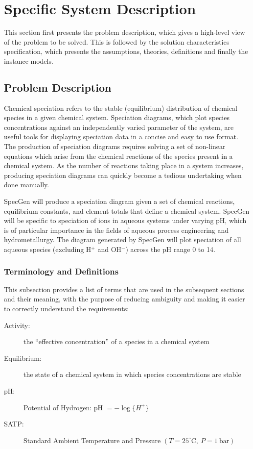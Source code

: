 \documentclass[12pt]{article}
\newcommand{\progname}{SpecGen} %
\begin{document}
\section{Specific System Description}

This section first presents the problem description, which gives a high-level
view of the problem to be solved.  This is followed by the solution 
characteristics specification, which presents the assumptions, theories, 
definitions and finally the instance models.

\subsection{Problem Description} \label{Sec_pd}
Chemical speciation refers to the stable (equilibrium) distribution of chemical 
species in a given chemical system. Speciation diagrams, which plot species 
concentrations against an independently varied parameter of the system, are 
useful tools for displaying speciation data in a concise and easy to use format. 
The production of speciation diagrams requires solving a set of non-linear 
equations which arise from the chemical reactions of the species present in a 
chemical system.  As the number of reactions taking place in a system increases, 
producing speciation diagrams can quickly become a tedious undertaking when done 
manually.

\progname{} will produce a speciation diagram given a set of chemical reactions, 
equilibrium constants, and element totals that define a chemical system. 
\progname{} will be specific to speciation of ions in aqueous systems under 
varying pH, which is of particular importance in the fields of aqueous process 
engineering and hydrometallurgy.  The diagram generated by \progname{} will 
plot speciation of all aqueous species (excluding H$^+$ and OH$^-$) across the 
pH range 0 to 14.

\subsubsection{Terminology and Definitions}

This subsection provides a list of terms that are used in the subsequent
sections and their meaning, with the purpose of reducing ambiguity and making it
easier to correctly understand the requirements:

\begin{description}
\item[Activity:] the ``effective concentration'' of a species in a chemical 
  system
\item[Equilibrium:] the state of a chemical system in which species 
  concentrations are stable
\item[pH:] Potential of Hydrogen:  pH $= -\log{\{H^+\}}$
\item[SATP:] Standard Ambient Temperature and Pressure
  $(T = 25^{\circ}\textrm{C}, ~P = 1~\textrm{bar})$  
\end{description}
\end{document}
